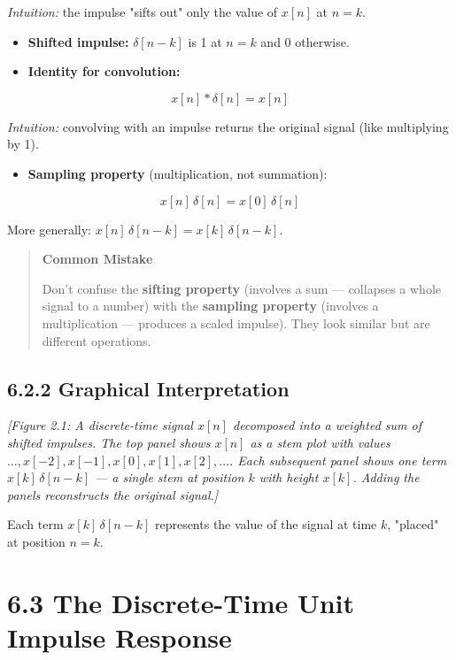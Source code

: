 \documentclass[11pt]{article}
\begin{document}
  \textit{Intuition:} the impulse "sifts out" only the value of $x[n]$ at $n=k$.

\begin{itemize}
  \item \textbf{Shifted impulse:} $\delta[n-k]$ is 1 at $n = k$ and 0 otherwise.
  \item \textbf{Identity for convolution:}
\end{itemize}

\[x[n] * \delta[n] = x[n]\]

  \textit{Intuition:} convolving with an impulse returns the original signal (like multiplying by 1).

\begin{itemize}
  \item \textbf{Sampling property} (multiplication, not summation):
\end{itemize}

\[x[n]\,\delta[n] = x[0]\,\delta[n]\]

  More generally: $x[n]\,\delta[n-k] = x[k]\,\delta[n-k]$.

\begin{quote}
\textbf{Common Mistake}

Don't confuse the \textbf{sifting property} (involves a sum — collapses a whole signal to a number) with the \textbf{sampling property} (involves a multiplication — produces a scaled impulse). They look similar but are different operations.
\end{quote}

\subsection*{6.2.2 Graphical Interpretation}

\textit{[Figure 2.1: A discrete-time signal $x[n]$ decomposed into a weighted sum of shifted impulses. The top panel shows $x[n]$ as a stem plot with values $\ldots, x[-2], x[-1], x[0], x[1], x[2], \ldots$. Each subsequent panel shows one term $x[k]\,\delta[n-k]$ — a single stem at position $k$ with height $x[k]$. Adding the panels reconstructs the original signal.]}

Each term $x[k]\,\delta[n-k]$ represents the value of the signal at time $k$, "placed" at position $n = k$.

\section*{6.3 The Discrete-Time Unit Impulse Response}
\end{document}
